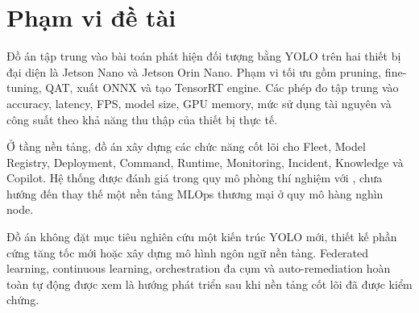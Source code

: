 \section{Phạm vi đề tài}

Đồ án tập trung vào bài toán phát hiện đối tượng bằng YOLO trên hai thiết bị đại
diện là Jetson Nano và Jetson Orin Nano. Phạm vi tối ưu gồm pruning, fine-tuning,
QAT, xuất ONNX và tạo TensorRT engine. Các phép đo tập trung vào accuracy,
latency, FPS, model size, GPU memory, mức sử dụng tài nguyên và công suất theo
khả năng thu thập của thiết bị thực tế.

Ở tầng nền tảng, đồ án xây dựng các chức năng cốt lõi cho Fleet, Model Registry,
Deployment, Command, Runtime, Monitoring, Incident, Knowledge và Copilot.
Hệ thống được đánh giá trong quy mô phòng thí nghiệm với , chưa hướng đến thay thế một nền tảng MLOps thương mại ở quy mô hàng
nghìn node.

Đồ án không đặt mục tiêu nghiên cứu một kiến trúc YOLO mới, thiết kế phần cứng
tăng tốc mới hoặc xây dựng mô hình ngôn ngữ nền tảng. Federated learning,
continuous learning, orchestration đa cụm và auto-remediation hoàn toàn tự động
được xem là hướng phát triển sau khi nền tảng cốt lõi đã được kiểm chứng.